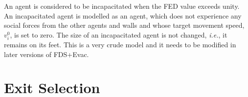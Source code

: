 \documentclass[12pt,a4paper,final,twoside]{stylevk}
\begin{document}


An agent is considered to be incapacitated when the FED value exceeds
unity.  An incapacitated agent is modelled as an agent, which does not
experience any social forces from the other agents and walls and whose
target movement speed, $v^0_i$, is set to zero.  The size of an
incapacitated agent is not changed, \emph{i.e.}, it remains on its
feet.  This is a very crude model and it needs to be modified in later
versions of FDS+Evac.


\section{Exit Selection}\label{Sec_ExitSel}
\end{document}
